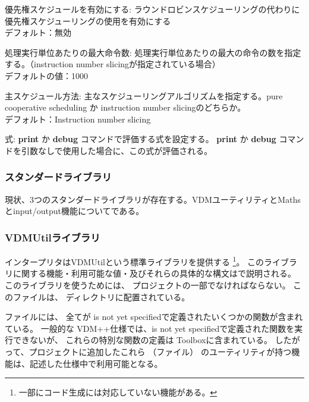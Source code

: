 \documentclass[\pformat,12pt]{jarticle}
\newcommand{\vdmslpp}{VDM++}
\newcommand{\Toolbox}{Toolbox}
\newcommand{\guicmd}[1]{{\gt #1}}
\newcommand{\keyw}[1]{{\sf #1}}
\begin{document}
\begin{list}{}{}
\item[\guicmd{優先権スケジュールを有効にする}:]
  ラウンドロビンスケジューリングの代わりに優先権スケジューリングの使用を有効にする \\
  デフォルト：無効
  
\item[\guicmd{処理実行単位あたりの最大命令数}:]
  処理実行単位あたりの最大の命令の数を指定する。（instruction number slicingが指定されている場合） \\
  デフォルトの値：1000

\item[\guicmd{主スケジュール方法}:]
  主なスケジューリングアルゴリズムを指定する。pure cooperative scheduling か 
  instruction number slicingのどちらか。 \\
  デフォルト：Instruction number slicing

\item[\textsf{式}:]
  \textbf{print} か \textbf{debug} コマンドで評価する式を設定する。
  \textbf{print} か \textbf{debug} コマンドを引数なしで使用した場合に、この式が評価される。
\end{list}



\subsubsection{スタンダードライブラリ}\label{subsec:standardlib}

現状、3つのスタンダードライブラリが存在する。VDMユーティリティとMathsとinput/output機能についてである。


\subsubsection*{VDMUtilライブラリ}
インタープリタはVDMUtilという標準ライブラリを提供する
\footnote{一部にコード生成には対応していない機能がある。}。
このライブラリに関する機能・利用可能な値・及びそれらの具体的な構文は\cite{LangMan-SCSK}で説明される。
このライブラリを使うためには、
プロジェクトの一部でなければならない。
このファイルは、
ディレクトリに配置されている。

ファイルには、
全てが \keyw{is not yet specified}で定義されたいくつかの関数が含まれている。
一般的な \vdmslpp 仕様では、\keyw{is not yet specified}で定義された関数を実行できないが、
これらの特別な関数の定義は \Toolbox に含まれている。
したがって、プロジェクトに追加したこれら
（ファイル）
のユーティリティが持つ機能は、記述した仕様中で利用可能となる。
\end{document}
